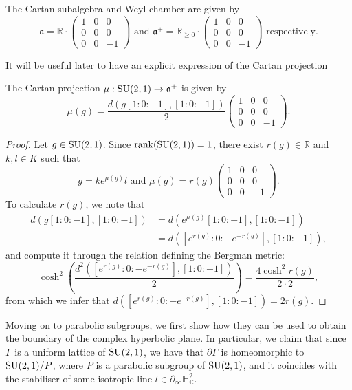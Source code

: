 \documentclass{report}
\begin{document}
The Cartan subalgebra and Weyl chamber are given by
\[
    \mathfrak a = \mathbb R \cdot \begin{pmatrix}
        1 & 0 & 0\\
        0 & 0 & 0\\
        0 & 0 & -1
    \end{pmatrix} \text{ and }
\mathfrak a^+ = \mathbb R_{\geq 0} \cdot \begin{pmatrix}
    1 & 0 & 0\\
    0 & 0 & 0\\
    0 & 0 & -1
\end{pmatrix} \text{ respectively}.
\]

It will be useful later to have an explicit expression of the Cartan projection
\begin{lemma}\label{lem:cartan_projection_su_2_1}
    The Cartan projection $\mu: \operatorname{{\mathrm{SU}}}(2,1) \to \mathfrak a^+$ is given by
    \[
    \mu\left(g\right) = \frac{d(g [1:0:-1], [1:0:-1])}{2} \begin{pmatrix}
        1 & 0 & 0\\
        0 & 0 & 0\\
        0 & 0 & -1
    \end{pmatrix}.
    \]
\end{lemma}
\begin{proof}
    Let $g \in \operatorname{{\mathrm{SU}}}(2,1)$.
    Since $\operatorname{rank}(\operatorname{{\mathrm{SU}}}(2,1)) = 1$, there exist $r(g) \in \mathbb R$ and $k, l \in K$ such that
    \[
    g = k e^{\mu(g)} l \text{ and } \mu(g) = r(g) \begin{pmatrix}
        1 & 0 & 0\\
        0 & 0 & 0\\
        0 & 0 & -1
    \end{pmatrix}.
    \]
    To calculate $r(g)$, we note that 
    \begin{align*}
        d\left(g[1:0:-1], [1:0:-1]\right) &= d\left(e^{\mu(g)}[1:0:-1], [1:0:-1]\right) \\
        &= d\left([e^{r(g)}:0:-e^{-r(g)}], [1:0:-1]\right),
    \end{align*}
    and compute it through the relation defining the Bergman metric:
    \[
    \cosh^2\left( \frac{d^2\left([e^{r(g)}:0:-e^{-r(g)}], [1:0:-1]\right)}{2} \right) = \frac{4 \cosh^2{r(g)}}{2 \cdot 2},
    \]
    from which we infer that $d\left([e^{r(g)}:0:-e^{-r(g)}], [1:0:-1]\right) = 2 r(g)$.
\end{proof}

Moving on to parabolic subgroups, we first show how they can be used to obtain the boundary of the complex hyperbolic plane.
In particular, we claim that since $\Gamma$ is a uniform lattice of $\operatorname{{\mathrm{SU}}}(2,1)$, we have that $\partial \Gamma$ is homeomorphic to $\operatorname{{\mathrm{SU}}}(2,1)/P$, where $P$ is a parabolic subgroup of $\operatorname{{\mathrm{SU}}}(2,1)$, and it coincides with the stabiliser of some isotropic line $l \in \partial_\infty \mathbb H^2_\mathbb C$.
\end{document}
